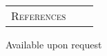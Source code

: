 \documentclass[11pt]{article}
\newcommand{\cellone}{3.5cm} %
\newcommand{\celltwo}{11cm}
\newcommand{\cellthree}{4cm}
\begin{document}
\begin{tabularx}{\textwidth}{p{\cellone} p{\celltwo} p{\cellthree}}
  \parbox[t][0cm]{\cellone}{R\textsc{eferences}} & \parbox[t][0cm]{6cm}{
    \vspace{-0.65cm}


    
   }
  
\end{tabularx}

\center Available upon request
\end{document}

